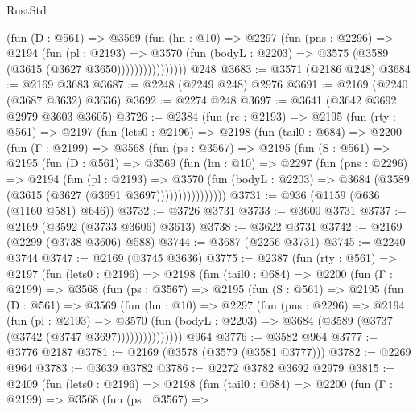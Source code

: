 \begin{lexlean}{RustStd}
\begin{coremodule}
                    (fun (D : @561) =>
                    @3569
                      (fun (hn : @10) =>
                      @2297
                        (fun (pns : @2296) =>
                        @2194
                          (fun (pl : @2193) =>
                          @3570
                            (fun (bodyL : @2203) => @3575 (@3589 (@3615 (@3627 @3650))))))))))))))))
    @248
@3683 := @3571 (@2186 @248)
@3684 := @2169 @3683
@3687 := @2248 (@2249 @248) @2976
@3691 := @2169 (@2240 (@3687 @3632) @3636)
@3692 := @2274 @248
@3697 := @3641 (@3642 @3692 @2979 @3603 @3605)
@3726 := @2384
    (fun (rc : @2193) =>
    @2195
      (fun (rty : @561) =>
      @2197
        (fun (lets0 : @2196) =>
        @2198
          (fun (tail0 : @684) =>
          @2200
            (fun (Γ : @2199) =>
            @3568
              (fun (ps : @3567) =>
              @2195
                (fun (S : @561) =>
                @2195
                  (fun (D : @561) =>
                  @3569
                    (fun (hn : @10) =>
                    @2297
                      (fun (pns : @2296) =>
                      @2194
                        (fun (pl : @2193) =>
                        @3570
                          (fun (bodyL : @2203) =>
                          @3684 (@3589 (@3615 (@3627 (@3691 @3697))))))))))))))))
@3731 := @936 (@1159 (@636 (@1160 @581) @646))
@3732 := @3726 @3731
@3733 := @3600 @3731
@3737 := @2169 (@3592 (@3733 @3606) @3613)
@3738 := @3622 @3731
@3742 := @2169 (@2299 (@3738 @3606) @588)
@3744 := @3687 (@2256 @3731)
@3745 := @2240 @3744
@3747 := @2169 (@3745 @3636)
@3775 := @2387
    (fun (rty : @561) =>
    @2197
      (fun (lets0 : @2196) =>
      @2198
        (fun (tail0 : @684) =>
        @2200
          (fun (Γ : @2199) =>
          @3568
            (fun (ps : @3567) =>
            @2195
              (fun (S : @561) =>
              @2195
                (fun (D : @561) =>
                @3569
                  (fun (hn : @10) =>
                  @2297
                    (fun (pns : @2296) =>
                    @2194
                      (fun (pl : @2193) =>
                      @3570
                        (fun (bodyL : @2203) =>
                        @3684 (@3589 (@3737 (@3742 (@3747 @3697)))))))))))))))
    @964
@3776 := @3582 @964
@3777 := @3776 @2187
@3781 := @2169 (@3578 (@3579 (@3581 @3777)))
@3782 := @2269 @964
@3783 := @3639 @3782
@3786 := @2272 @3782 @3692 @2979
@3815 := @2409
    (fun (lets0 : @2196) =>
    @2198
      (fun (tail0 : @684) =>
      @2200
        (fun (Γ : @2199) =>
        @3568
          (fun (ps : @3567) =>

\end{coremodule}
\end{lexlean}
